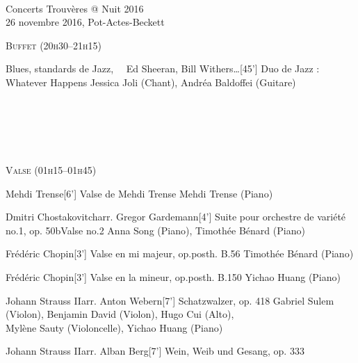 \documentclass[a4paper,11pt,poets,durations]{ConcProg}
\begin{document}
{
\selectfont

~\\

\begin{programme}{
    Concerts Trouvères @ Nuit 2016
\\  {\normalsize 26 novembre 2016, Pot-Actes-Beckett}
}
~\\
\begin{center}
\textsc{Buffet (20h30--21h15)}
\end{center}
  \begin{part}[]
    \begin{composition}{Blues, standards de Jazz, ~~Ed Sheeran, Bill Withers\dots}{}{[45'] Duo de Jazz : Whatever Happens}{}
      {\small Jessica Joli (Chant), Andréa Baldoffei (Guitare)}
    \end{composition}\\
~\\
~\\
~\\
\begin{center}
\textsc{Valse (01h15--01h45)}
\end{center}
    \begin{composition}{Mehdi Trense}{}{[6'] Valse de Mehdi Trense}{}
      {\small Mehdi Trense (Piano)}
    \end{composition}
    \begin{composition}{Dmitri Chostakovitch}{arr. Gregor Gardemann}{[4'] Suite pour orchestre de variété no.1, op. 50b}{Valse no.2}
      {\small Anna Song (Piano), Timothée Bénard (Piano)}
    \end{composition}
    \begin{composition}{Frédéric Chopin}{}{[3'] Valse en mi majeur, op.posth. B.56}{}
      {\small Timothée Bénard (Piano)}
    \end{composition}
    \begin{composition}{Frédéric Chopin}{}{[3'] Valse en la mineur, op.posth. B.150}{}
      {\small Yichao Huang (Piano)}
    \end{composition}
    \begin{composition}{Johann Strauss II}{arr. Anton Webern}{[7'] Schatzwalzer, op. 418}{}
      {\small Gabriel Sulem (Violon), Benjamin David (Violon), Hugo Cui (Alto),\\Mylène Sauty (Violoncelle), Yichao Huang (Piano)}
    \end{composition}
    \begin{composition}{Johann Strauss II}{arr. Alban Berg}{[7'] Wein, Weib und Gesang, op. 333}{}

\end{composition}
\end{part}
\end{programme}}
\end{document}
